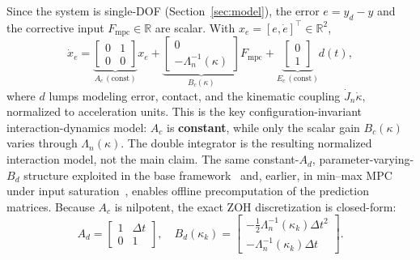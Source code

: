 Since the system is single-DOF (Section~\ref{sec:model}), the error $e=y_d-y$ and the corrective input $F_{\text{mpc}}\in\mathbb{R}$ are scalar. With $x_e=[e,\dot e]^\top\in\mathbb{R}^2$,
\begin{equation}
\dot x_e = \underbrace{\begin{bmatrix}0&1\\0&0\end{bmatrix}}_{A_c\,(\text{const})} x_e + \underbrace{\begin{bmatrix}0\\-\Lambda_n^{-1}(\kappa)\end{bmatrix}}_{B_c(\kappa)} F_{\text{mpc}} + \underbrace{\begin{bmatrix}0\\1\end{bmatrix}}_{E_c\,(\text{const})} d(t),
\label{eq:errdyn}
\end{equation}
where $d$ lumps modeling error, contact, and the kinematic coupling $\dot J_n\dot\kappa$, normalized to acceleration units. This is the key configuration-invariant interaction-dynamics model: $A_c$ is \textbf{constant}, while only the scalar gain $B_c(\kappa)$ varies through $\Lambda_n(\kappa)$. The double integrator is the resulting normalized interaction model, not the main claim. The same constant-$A_d$, parameter-varying-$B_d$ structure exploited in the base framework~\cite{cao2026phri} and, earlier, in min--max MPC under input saturation~\cite{cao2005minmax}, enables offline precomputation of the prediction matrices. Because $A_c$ is nilpotent, the exact ZOH discretization is closed-form:
\begin{equation}
A_d=\begin{bmatrix}1&\Delta t\\0&1\end{bmatrix},\quad B_d(\kappa_k)=\begin{bmatrix}-\tfrac12\Lambda_n^{-1}(\kappa_k)\Delta t^2\\-\Lambda_n^{-1}(\kappa_k)\Delta t\end{bmatrix}.
\label{eq:disc}
\end{equation}


